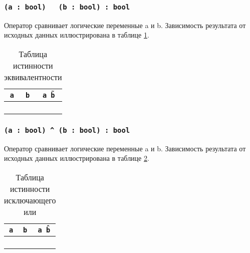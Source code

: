 \subsubsection{\texttt{(a : bool) ~ (b : bool) : bool}}

Оператор сравнивает логические переменные a и b. Зависимость результата от исходных данных иллюстрирована в таблице \ref{logeqtable}.

\begin{table}[htb]
	\caption{Таблица истинности эквивалентности}
	\label{logeqtable}
	\begin{tabular}{|c|c|c|}
		\hline
		\texttt{a} & \texttt{b} & \texttt{a \~ b} \\ \hline
		\false{} & \false{} & \true{}   	\\ \hline
		\false{} & \true{}  & \false{}  	\\ \hline
		\true{}  & \false{} & \false{}  	\\ \hline
		\true{}  & \true{}  & \true{}   	\\ \hline
	\end{tabular}
	\vspace{0em}
\end{table}

\subsubsection{\texttt{(a : bool) ^ (b : bool) : bool}}

Оператор сравнивает логические переменные a и b. Зависимость результата от исходных данных иллюстрирована в таблице \ref{logdifftable}.

\begin{table}[htb]
	\caption{Таблица истинности исключающего или}
	\label{logdifftable}
	\begin{tabular}{|c|c|c|}
		\hline
		\texttt{a} & \texttt{b} & \texttt{a \^ b} \\ \hline
		\false{} & \false{} & \false{}  	\\ \hline
		\false{} & \true{}  & \true{}   	\\ \hline
		\true{}  & \false{} & \true{}  		\\ \hline
		\true{}  & \true{}  & \false{}  	\\ \hline
	\end{tabular}
	\vspace{-2em}
\end{table}

